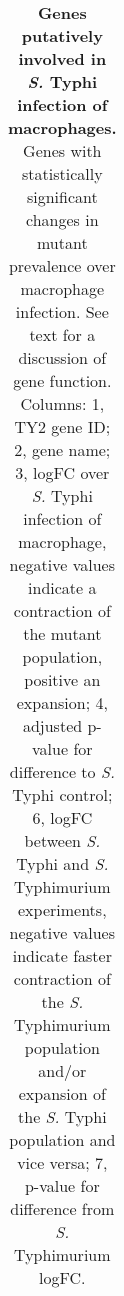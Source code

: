 %
\begin{table}
   \centering
   \noindent
    \caption[Genes putatively involved in {\it S.} Typhi infection of macrophages]{\textbf{Genes putatively involved in {\it S.} Typhi infection of macrophages.} Genes with statistically significant changes in mutant prevalence over macrophage infection. See text for a discussion of gene function.  Columns: 1, TY2 gene ID; 2, gene name; 3, logFC over {\it S.} Typhi infection of macrophage, negative values indicate a contraction of the mutant population, positive an expansion; 4, adjusted p-value for difference to {\it S.} Typhi control; 6, logFC between {\it S.} Typhi and {\it S.} Typhimurium experiments, negative values indicate faster contraction of the {\it S.} Typhimurium population and/or expansion of the {\it S.} Typhi population and vice versa; 7, p-value for difference from {\it S.} Typhimurium logFC. }
    \begin{tabular}{ l
    				l
				r
    				c
				r
				c
				}
   

\end{tabular}
\end{table}
